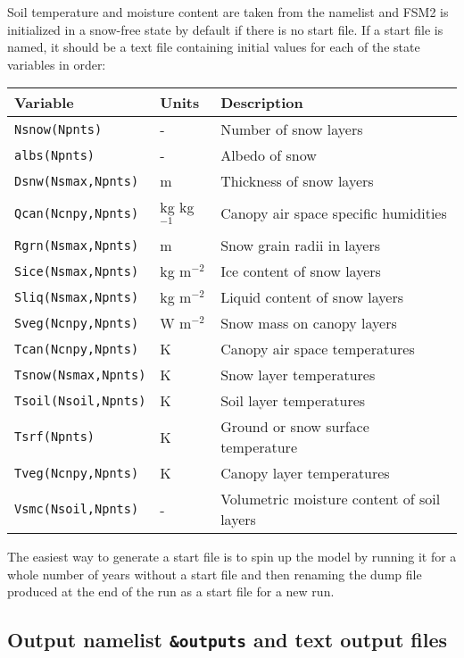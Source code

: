 \documentclass{article}
\begin{document}
Soil temperature and moisture content are taken from the namelist and FSM2 is initialized in a snow-free state by default if there is no start file. If a start file is named, it should be a text file containing initial values for each of the state variables in order:
\eject
\begin{longtable}{|l|l|l|}
\hline
Variable & Units & Description \\
\hline
{\tt Nsnow(Npnts)}       & -            & Number of snow layers                      \\
{\tt albs(Npnts)}        & -            & Albedo of snow                             \\
{\tt Dsnw(Nsmax,Npnts)}  & m            & Thickness of snow layers                   \\
{\tt Qcan(Ncnpy,Npnts)}  & kg kg$^{-1}$ & Canopy air space specific humidities       \\
{\tt Rgrn(Nsmax,Npnts)}  & m            & Snow grain radii in layers                 \\
{\tt Sice(Nsmax,Npnts)}  & kg m$^{-2}$  & Ice content of snow layers                 \\
{\tt Sliq(Nsmax,Npnts)}  & kg m$^{-2}$  & Liquid content of snow layers              \\
{\tt Sveg(Ncnpy,Npnts)}  & W m$^{-2}$   & Snow mass on canopy layers                 \\
{\tt Tcan(Ncnpy,Npnts)}  & K            & Canopy air space temperatures              \\
{\tt Tsnow(Nsmax,Npnts)} & K            & Snow layer temperatures                    \\
{\tt Tsoil(Nsoil,Npnts)} & K            & Soil layer temperatures                    \\
{\tt Tsrf(Npnts)}        & K            & Ground or snow surface temperature         \\
{\tt Tveg(Ncnpy,Npnts)}  & K            & Canopy layer temperatures                  \\
{\tt Vsmc(Nsoil,Npnts)}  & -            & Volumetric moisture content of soil layers \\
\hline 
\end{longtable}

The easiest way to generate a start file is to spin up the model by running it for a whole number of years without a start file and then renaming the dump file produced at the end of the run as a start file for a new run.

\subsection{Output namelist {\tt \&outputs} and text output files}
\end{document}
